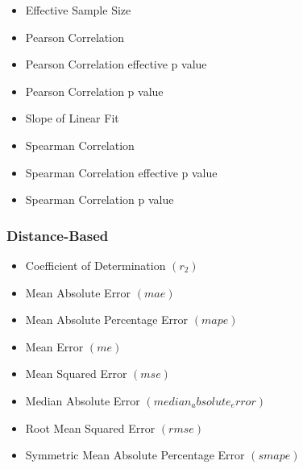 \documentclass[11pt]{article}
\begin{document}
	\begin{itemize}
	
    \item Effective Sample Size 

    \item Pearson Correlation 

    \item Pearson Correlation effective p value 

    \item Pearson Correlation p value 
 
    \item Slope of Linear Fit 

    \item Spearman Correlation 

    \item Spearman Correlation effective p value 

    \item Spearman Correlation p value 
    
    \end{itemize}

	\subsubsection{Distance-Based}
	\begin{itemize}
	
	\item Coefficient of Determination $(r_2)$

    \item Mean Absolute Error $(mae)$

    \item Mean Absolute Percentage Error $(mape)$

    \item Mean Error $(me)$

    \item Mean Squared Error $(mse)$

    \item Median Absolute Error $(median_absolute_error)$

    \item Root Mean Squared Error $(rmse)$

    \item Symmetric Mean Absolute Percentage Error $(smape)$
	
	\end{itemize}

    


	
\end{document}

